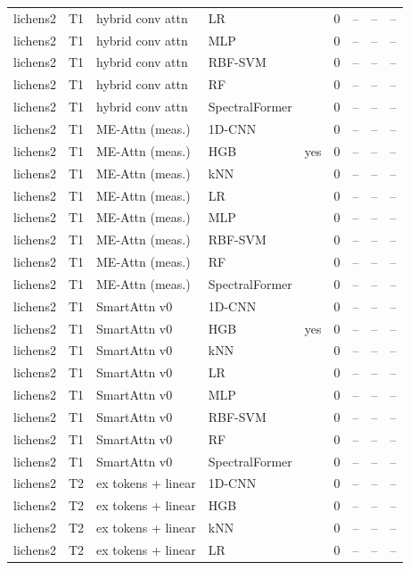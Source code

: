 \begin{tabular}{lllllcccc}
lichens2 & T1 & hybrid conv attn & LR &  & 0 & -- & -- & -- \\
lichens2 & T1 & hybrid conv attn & MLP &  & 0 & -- & -- & -- \\
lichens2 & T1 & hybrid conv attn & RBF-SVM &  & 0 & -- & -- & -- \\
lichens2 & T1 & hybrid conv attn & RF &  & 0 & -- & -- & -- \\
lichens2 & T1 & hybrid conv attn & SpectralFormer &  & 0 & -- & -- & -- \\
lichens2 & T1 & ME-Attn (meas.) & 1D-CNN &  & 0 & -- & -- & -- \\
lichens2 & T1 & ME-Attn (meas.) & HGB & yes & 0 & -- & -- & -- \\
lichens2 & T1 & ME-Attn (meas.) & kNN &  & 0 & -- & -- & -- \\
lichens2 & T1 & ME-Attn (meas.) & LR &  & 0 & -- & -- & -- \\
lichens2 & T1 & ME-Attn (meas.) & MLP &  & 0 & -- & -- & -- \\
lichens2 & T1 & ME-Attn (meas.) & RBF-SVM &  & 0 & -- & -- & -- \\
lichens2 & T1 & ME-Attn (meas.) & RF &  & 0 & -- & -- & -- \\
lichens2 & T1 & ME-Attn (meas.) & SpectralFormer &  & 0 & -- & -- & -- \\
lichens2 & T1 & SmartAttn v0 & 1D-CNN &  & 0 & -- & -- & -- \\
lichens2 & T1 & SmartAttn v0 & HGB & yes & 0 & -- & -- & -- \\
lichens2 & T1 & SmartAttn v0 & kNN &  & 0 & -- & -- & -- \\
lichens2 & T1 & SmartAttn v0 & LR &  & 0 & -- & -- & -- \\
lichens2 & T1 & SmartAttn v0 & MLP &  & 0 & -- & -- & -- \\
lichens2 & T1 & SmartAttn v0 & RBF-SVM &  & 0 & -- & -- & -- \\
lichens2 & T1 & SmartAttn v0 & RF &  & 0 & -- & -- & -- \\
lichens2 & T1 & SmartAttn v0 & SpectralFormer &  & 0 & -- & -- & -- \\
lichens2 & T2 & ex tokens + linear & 1D-CNN &  & 0 & -- & -- & -- \\
lichens2 & T2 & ex tokens + linear & HGB &  & 0 & -- & -- & -- \\
lichens2 & T2 & ex tokens + linear & kNN &  & 0 & -- & -- & -- \\
lichens2 & T2 & ex tokens + linear & LR &  & 0 & -- & -- & -- \\

\end{tabular}

